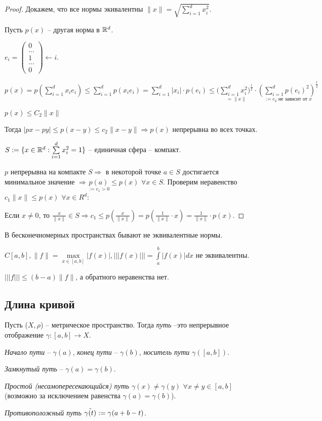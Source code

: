 \begin{proof}
    Докажем, что все нормы экивалентны $\|x\|=\sqrt{\sum\limits_{i=1}^d x_i^2}$.

    Пусть $p(x)$ – другая норма в $\mathbb{R}^d$.

    $e_i=\begin{pmatrix} 0 \\ ... \\ 1 \\ ... \\0 \end{pmatrix}\leftarrow 
    i$.
    
    $p(x)=p(\sum\limits_{i=1}^d x_ie_i)\leq \sum\limits_{i=1}^d p(x_ie_i)=\sum\limits_{i=1}^d |x_i|\cdot p(e_i)\leq(\underset{=\|x\|}{\sum\limits_{i=1}^d x_i^2)^{\frac{1}{2}}}\cdot \underset{:=c_2\text{ не зависит от }x}{(\sum\limits_{i=1}^d p(e_i)^2)^{\frac{1}{2}}}$

    $p(x)\leq C_2\|x\|$

    Тогда $|px-py|\leq p(x-y) \leq c_2 \|x-y\|\Rightarrow p(x)$ непрерывна во всех точках.

    $S:=\{x\in\mathbb{R}^d: \sum\limits_{i=1}^d x_i^2 =1\}$ – единичная сфера – компакт.

    $p$ непрерывна на компакте $S\Rightarrow$ в некоторой точке $a\in S$ достигается минимальное значение $\Rightarrow \underset{:=c_1>0}{p(a)}\leq p(x)$ $\forall x\in S$. Проверим неравенство $c_1\|x\|\leq p(x)$ $\forall x\in R^d$:

    Если $x\neq 0$, то $\frac{x}{\|x\|}\in S\Rightarrow c_1\leq p(\frac{x}{\|x\|})=p(\frac{1}{\|x\|}\cdot x)=\frac{1}{\|x\|}\cdot p(x)$.
\end{proof}

\begin{remark}
    В бесконечномерных пространствах бывают не эквивалентные нормы.

    $C[a, b],  \|f\|=\max\limits_{x\in [a, b]}|f(x)|, |||f(x)|||=\int\limits_a^b|f(x)|dx$ не эквивалентны.

    $|||f|||\leq (b-a)\|f\|$, а обратного неравенства нет.
\end{remark}

\subsection{Длина кривой}

\begin{definition}
    Пусть ($X, \rho$) –  метрическое пространство. Тогда \textit{путь} –это непрерывное отображение $\gamma:[a, b]\rightarrow X$.

    \textit{Начало пути} – $\gamma(a)$, \textit{конец пути} – $\gamma(b)$, \textit{носитель пути} $\gamma([a, b])$.

    \textit{Замкнутый путь} – $\gamma(a)=\gamma(b)$.

    \textit{Простой (несамопересекающийся) путь} $\gamma(x)\neq \gamma(y)$ $\forall x\neq y\in [a, b]$ (возможно за исключением равенства $\gamma(a)=\gamma(b)$).

    \textit{Противоположный путь} $\Tilde{\gamma(t)}:=\gamma(a+b-t)$.
\end{definition}

